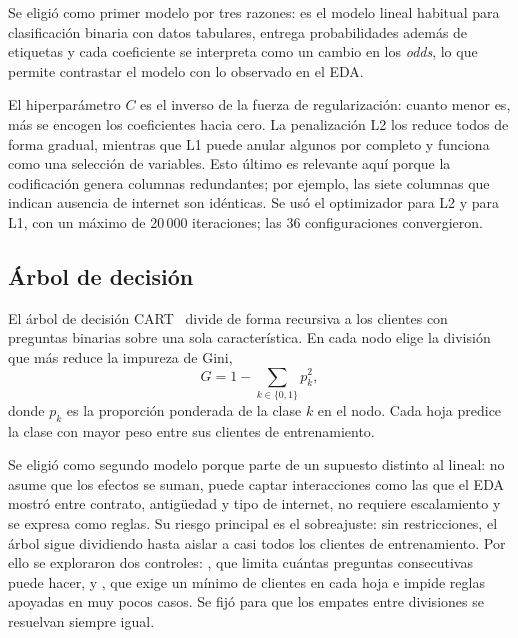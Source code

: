 Se eligió como primer modelo por tres razones: es el modelo lineal habitual para clasificación binaria
con datos tabulares, entrega probabilidades además de etiquetas y cada coeficiente se interpreta como
un cambio en los \emph{odds}, lo que permite contrastar el modelo con lo observado en el EDA.

El hiperparámetro $C$ es el inverso de la fuerza de regularización: cuanto menor es, más se encogen
los coeficientes hacia cero. La penalización L2 los reduce todos de forma gradual, mientras que L1
puede anular algunos por completo y funciona como una selección de variables. Esto último es
relevante aquí porque la codificación genera columnas redundantes; por ejemplo, las siete columnas
que indican ausencia de internet son idénticas. Se usó el optimizador  para L2 y
 para L1, con un máximo de 20\,000 iteraciones; las 36 configuraciones convergieron.

\subsection{Árbol de decisión}
El árbol de decisión CART~\cite{cart} divide de forma recursiva a los clientes con preguntas binarias
sobre una sola característica. En cada nodo elige la división que más reduce la impureza de Gini,
\begin{equation}
    G=1-\sum_{k\in\{0,1\}}p_k^2 ,
\end{equation}
donde $p_k$ es la proporción ponderada de la clase $k$ en el nodo. Cada hoja predice la clase con
mayor peso entre sus clientes de entrenamiento.

Se eligió como segundo modelo porque parte de un supuesto distinto al lineal: no asume que los efectos
se suman, puede captar interacciones como las que el EDA mostró entre contrato, antigüedad y tipo de
internet, no requiere escalamiento y se expresa como reglas. Su riesgo principal es el sobreajuste:
sin restricciones, el árbol sigue dividiendo hasta aislar a casi todos los clientes de
entrenamiento. Por ello se exploraron dos controles: , que limita cuántas preguntas
consecutivas puede hacer, y , que exige un mínimo de clientes en cada hoja e
impide reglas apoyadas en muy pocos casos. Se fijó  para que los empates entre
divisiones se resuelvan siempre igual.

